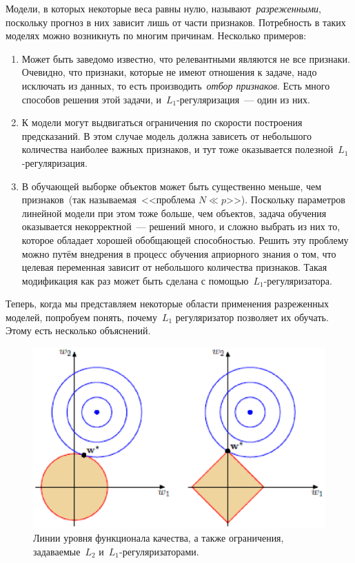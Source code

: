 \documentclass[12pt,fleqn]{article}
\begin{document}
Модели, в которых некоторые веса равны нулю, называют~\emph{разреженными},
поскольку прогноз в них зависит лишь от части признаков.
Потребность в таких моделях можно возникнуть по многим причинам.
Несколько примеров:
\begin{enumerate}
    \item Может быть заведомо известно, что релевантными являются не все признаки.
        Очевидно, что признаки, которые не имеют отношения к задаче, надо исключать из данных,
        то есть производить~\emph{отбор признаков}.
        Есть много способов решения этой задачи, и~$L_1$-регуляризация~--- один из них.
    \item К модели могут выдвигаться ограничения по скорости построения предсказаний.
        В этом случае модель должна зависеть от небольшого количества наиболее важных признаков,
        и тут тоже оказывается полезной~$L_1$-регуляризация.
    \item В обучающей выборке объектов может быть существенно меньше, чем признаков~(так называемая~<<проблема $N \ll p$>>).
        Поскольку параметров линейной модели при этом тоже больше, чем объектов, задача обучения оказывается
        некорректной~--- решений много, и сложно выбрать из них то, которое обладает
        хорошей обобщающей способностью.
        Решить эту проблему можно путём внедрения в процесс обучения априорного знания о том,
        что целевая переменная зависит от небольшого количества признаков.
        Такая модификация как раз может быть сделана с помощью~$L_1$-регуляризатора.
\end{enumerate}
Теперь, когда мы представляем некоторые области применения разреженных моделей,
попробуем понять, почему~$L_1$ регуляризатор позволяет их обучать.
Этому есть несколько объяснений.

\begin{figure}[t]
    \centering
    \includegraphics[width=0.5\linewidth]{reg.eps}
    \caption{Линии уровня функционала качества, а также ограничения,
        задаваемые~$L_2$ и~$L_1$-регуляризаторами.}
    \label{pic:regularizers}
\end{figure}
\end{document}

